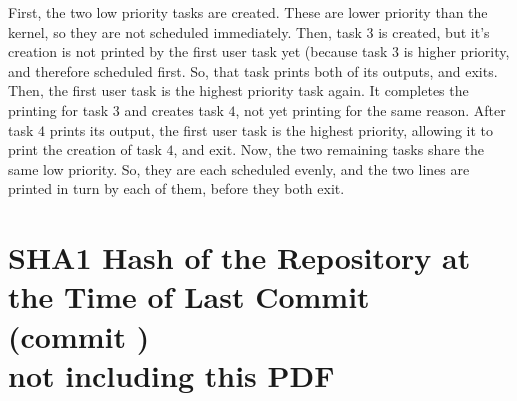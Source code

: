 \documentclass{article}
\begin{document}
First, the two low priority tasks are created. These are lower priority than the kernel, so they are not scheduled immediately. 
Then, task $3$ is created, but it's creation is not printed by the first user task yet (because task $3$ is higher priority, and therefore scheduled first. 
So, that task prints both of its outputs, and exits. 
Then, the first user task is the highest priority task again. It completes the printing for task $3$ and creates task $4$, not yet printing for the same reason. 
After task $4$ prints its output, the first user task is the highest priority, allowing it to print the creation of task $4$, and exit.
Now, the two remaining tasks share the same low priority. So, they are each scheduled evenly, and the two lines are printed in turn by each of them, before they both exit.


\section{SHA1 Hash of the Repository at the Time of Last Commit \\(commit ) \\ not including this PDF}

\begin{verbatim}
\end{verbatim}
\end{document}
